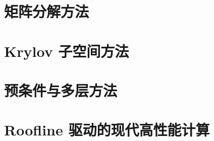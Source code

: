 \documentclass[11pt,openany]{ctexbook}
\begin{document}
\part{矩阵分解方法}






\part{Krylov 子空间方法}






\part{预条件与多层方法}






\part{Roofline 驱动的现代高性能计算}








\appendix

\backmatter

\end{document}
